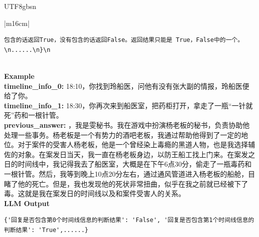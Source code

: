 \documentclass[11pt]{article}
\begin{document}
{\begin{CJK}{UTF8}{gbsn}
\begin{table}[ht!]
\centering
\begin{minipage}{\textwidth}
\begin{tabular}{|m{16cm}|}
\begin{minipage}[t]{\linewidth}
\small\begin{verbatim}
包含的话返回True，没有包含的话返回False。返回结果只能是 True，False中的一个。\n......\n}\n
\end{verbatim}
\end{minipage} \\
\hline
{}  \textbf{Example}  \\
 \textbf{  timeline\_info\_0:} \small18:10，你找到玲船医，问他有没有张大副的情报，玲船医便给了你。\\
  \textbf{  timeline\_info\_1:} \small18:30，你再次来到船医室，把药柜打开，拿走了一瓶“一针就死”药和一根针管。\\
 \textbf{  previous\_answer:} ，我是雯秘书。我在游戏中扮演杨老板的秘书，负责协助他处理一些事务。杨老板是一个有势力的酒吧老板，我通过帮助他得到了一定的地位。对于案件的受害人杨老板，他是一个曾经染上毒瘾的黑道人物，也是我选择辅佐的对象。在案发日当天，我一直在杨老板身边，以防王船工找上门来。在案发之日的时间线中，我记得我去了船医室，大概是在下午6点30分，偷走了一瓶毒药和一根针管。然后，我等到晚上10点20分左右，通过通风管道进入杨老板的船舱，目睹了他的死亡。但是，我也发现他的死状非常扭曲，似乎在我之前就已经被下了毒。这就是我在案发日的时间线以及和案件受害人的关系。\\


\hline
{}  \textbf{LLM Output}  \\
\hline
\begin{minipage}[t]{\linewidth}
\small\begin{verbatim}
{'回复是否包含第0个时间线信息的判断结果': 'False', '回复是否包含第1个时间线信息的判断结果': 'True',......}


\end{verbatim}
\end{minipage}
\end{tabular}
\end{minipage}
\end{table}
\end{CJK}}
\end{document}
